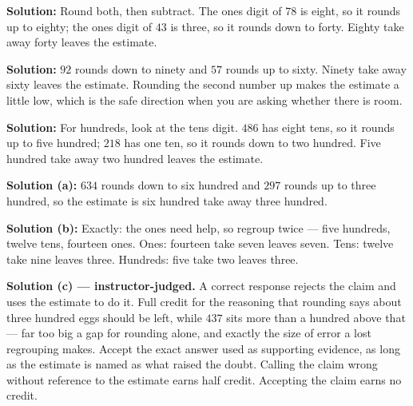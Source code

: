 \documentclass[12pt]{article}
\begin{document}




\textbf{Solution:} Round both, then subtract. The ones digit of $78$ is eight, so it rounds up to eighty; the ones digit of $43$ is three, so it rounds down to forty. Eighty take away forty leaves the estimate. 


\textbf{Solution:} $92$ rounds down to ninety and $57$ rounds up to sixty. Ninety take away sixty leaves the estimate. Rounding the second number up makes the estimate a little low, which is the safe direction when you are asking whether there is room. 


\textbf{Solution:} For hundreds, look at the tens digit. $486$ has eight tens, so it rounds up to five hundred; $218$ has one ten, so it rounds down to two hundred. Five hundred take away two hundred leaves the estimate. 


\textbf{Solution (a):} $634$ rounds down to six hundred and $297$ rounds up to three hundred, so the estimate is six hundred take away three hundred. 

\textbf{Solution (b):} Exactly: the ones need help, so regroup twice --- five hundreds, twelve tens, fourteen ones. Ones: fourteen take seven leaves seven. Tens: twelve take nine leaves three. Hundreds: five take two leaves three. 

\textbf{Solution (c) --- instructor-judged.} A correct response rejects the claim and uses the estimate to do it. Full credit for the reasoning that rounding says about three hundred eggs should be left, while $437$ sits more than a hundred above that --- far too big a gap for rounding alone, and exactly the size of error a lost regrouping makes. Accept the exact answer used as supporting evidence, as long as the estimate is named as what raised the doubt. Calling the claim wrong without reference to the estimate earns half credit. Accepting the claim earns no credit.
\end{document}
